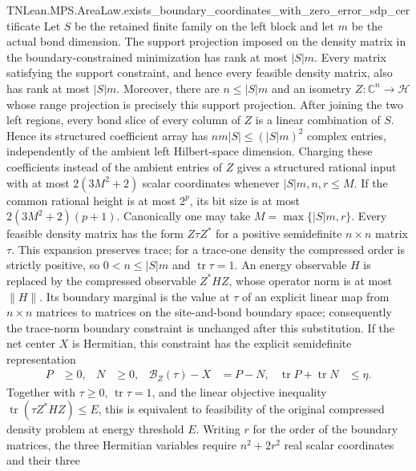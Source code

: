 \begin{lemma}
{        TNLean.MPS.AreaLaw.exists_boundary_coordinates_with_zero_error_sdp_certificate}
    \leanok
    Let $S$ be the retained finite family on the left block and let $m$ be
    the actual bond dimension.  The support projection imposed on the
    density matrix in the boundary-constrained minimization has rank at
    most $|S|m$.  Every matrix satisfying the support constraint, and hence
    every feasible density matrix, also has rank at most $|S|m$.
    Moreover, there are $n\le |S|m$ and an isometry $Z:\mathbb C^n\to
        \mathcal H$ whose range projection is precisely this support projection.
    After joining the two left regions, every bond slice of every column of
    $Z$ is a linear combination of $S$.  Hence its structured coefficient
    array has $nm|S|\le (|S|m)^2$ complex entries, independently of the
    ambient left Hilbert-space dimension.
    Charging these coefficients instead of the ambient entries of $Z$ gives a
    structured rational input with at most
    $2(3M^2+2)$ scalar coordinates whenever $|S|m,n,r\le M$.  If the common
    rational height is at most $2^p$, its bit size is at most
    $2(3M^2+2)(p+1)$.  Canonically one may take
    $M=\max\{|S|m,r\}$.
    Every feasible density matrix has the form $Z\tau Z^*$ for a positive
    semidefinite $n\times n$ matrix $\tau$.  This expansion preserves trace;
    for a trace-one density the compressed order is strictly positive, so
    $0<n\le |S|m$ and $\operatorname{tr}\tau=1$.  An energy observable $H$
    is replaced by the compressed observable
    $Z^*HZ$, whose operator norm is at most $\lVert H\rVert$.  Its boundary
    marginal is the value at $\tau$ of an explicit
    linear map from $n\times n$ matrices to matrices on the site-and-bond
    boundary space; consequently the trace-norm boundary constraint is
    unchanged after this substitution. If the net center $X$ is Hermitian,
    this constraint has the explicit semidefinite representation
    \begin{align*}
        P & \ge0,                                 & N        & \ge0, & \mathcal B_Z(\tau)-X & =P-N,
          & \operatorname{tr}P+\operatorname{tr}N & \le\eta.
    \end{align*}
    Together with $\tau\ge0$, $\operatorname{tr}\tau=1$, and the linear
    objective inequality
    $\operatorname{tr}(\tau Z^*HZ)\le E$, this is equivalent to feasibility
    of the original compressed density problem at energy threshold $E$.
    Writing $r$ for the order of the boundary matrices, the three Hermitian
    variables require $n^2+2r^2$ real scalar coordinates and their three

\end{lemma}
